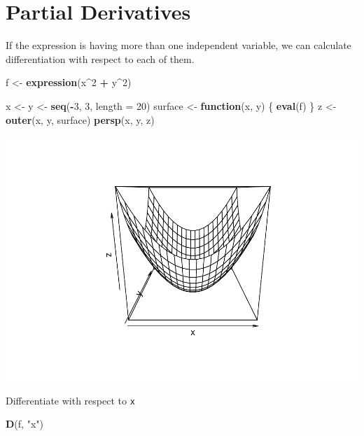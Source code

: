 \documentclass[]{book}
\newenvironment{Shaded}{\begin{snugshade}}{\end{snugshade}}
\newcommand{\ControlFlowTok}[1]{\textcolor[rgb]{0.13,0.29,0.53}{\textbf{#1}}}
\newcommand{\DataTypeTok}[1]{\textcolor[rgb]{0.13,0.29,0.53}{#1}}
\newcommand{\DecValTok}[1]{\textcolor[rgb]{0.00,0.00,0.81}{#1}}
\newcommand{\KeywordTok}[1]{\textcolor[rgb]{0.13,0.29,0.53}{\textbf{#1}}}
\newcommand{\NormalTok}[1]{#1}
\newcommand{\OperatorTok}[1]{\textcolor[rgb]{0.81,0.36,0.00}{\textbf{#1}}}
\newcommand{\StringTok}[1]{\textcolor[rgb]{0.31,0.60,0.02}{#1}}
\begin{document}
\hypertarget{partial-derivatives}{%
\section{Partial Derivatives}\label{partial-derivatives}}

If the expression is having more than one independent variable, we can calculate differentiation with respect to each of them.

\begin{Shaded}
\begin{Highlighting}[]
\NormalTok{f <-}\StringTok{ }\KeywordTok{expression}\NormalTok{(x}\OperatorTok{^}\DecValTok{2} \OperatorTok{+}\StringTok{ }\NormalTok{y}\OperatorTok{^}\DecValTok{2}\NormalTok{)}

\NormalTok{x <-}\StringTok{ }\NormalTok{y <-}\StringTok{ }\KeywordTok{seq}\NormalTok{(}\OperatorTok{-}\DecValTok{3}\NormalTok{, }\DecValTok{3}\NormalTok{, }\DataTypeTok{length =} \DecValTok{20}\NormalTok{)}
\NormalTok{surface <-}\StringTok{ }\ControlFlowTok{function}\NormalTok{(x, y) \{}
  \KeywordTok{eval}\NormalTok{(f)}
\NormalTok{\}}
\NormalTok{z <-}\StringTok{ }\KeywordTok{outer}\NormalTok{(x, y, surface)}
\KeywordTok{persp}\NormalTok{(x, y, z)}
\end{Highlighting}
\end{Shaded}

\includegraphics{bookdown-demo_files/figure-latex/unnamed-chunk-11-1.pdf}

Differentiate with respect to \texttt{x}

\begin{Shaded}
\begin{Highlighting}[]
\KeywordTok{D}\NormalTok{(f, }\StringTok{"x"}\NormalTok{)}
\end{Highlighting}
\end{Shaded}
\end{document}
